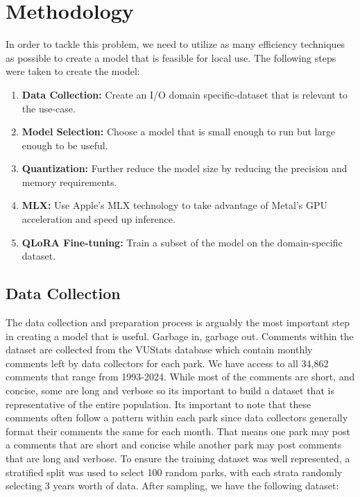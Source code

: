 \documentclass[12pt]{article}
\begin{document}
\section{Methodology}
In order to tackle this problem, we need to utilize as many efficiency techniques as possible to create a model that is feasible for local use. The following steps were taken to create the model:
\begin{enumerate}
    \item \textbf{Data Collection:} Create an I/O domain specific-dataset that is relevant to the use-case.
    \item \textbf{Model Selection:} Choose a model that is small enough to run but large enough to be useful.
    \item \textbf{Quantization:} Further reduce the model size by reducing the precision and memory requirements.
    \item \textbf{MLX:} Use Apple's MLX technology to take advantage of Metal's GPU acceleration and speed up inference.
    \item \textbf{QLoRA Fine-tuning:} Train a subset of the model on the domain-specific dataset.
\end{enumerate}

\subsection{Data Collection}
The data collection and preparation process is arguably the most important step in creating a model that is useful. Garbage in, garbage out.
Comments within the dataset are collected from the VUStats database which contain monthly comments left by data collectors for each park. We have access to all 34,862 comments that range from 1993-2024. While most of the comments are short, and concise, some are long and verbose so its important to build a dataset that is representative of the entire population.
Its important to note that these comments often follow a pattern within each park since data collectors generally format their comments the same for each month. That means one park may post a comments that are short and concise while another park may post comments that are long and verbose. To ensure the training dataset was well represented, a stratified split was used to select 100 random parks, with each strata randomly selecting 3 years worth of data. After sampling, we have the following dataset:
\end{document}
